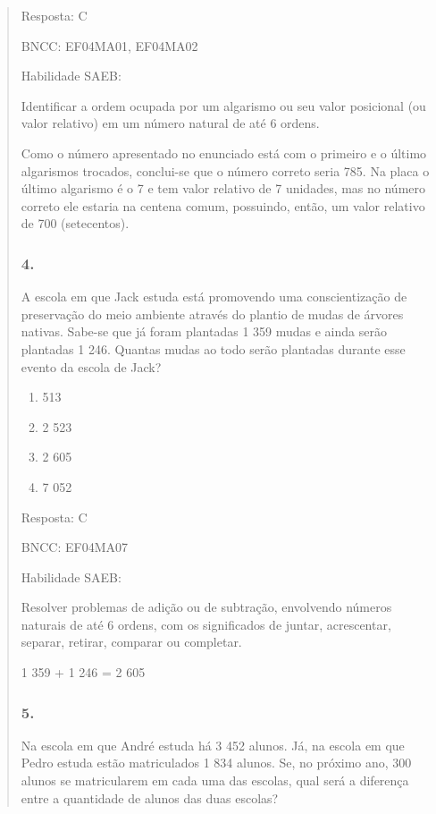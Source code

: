 \begin{enumerate}
\begin{escolha}
\begin{enumerate}
\begin{itemize}
\begin{itemize}
\begin{escolha}
\begin{quote}
\begin{escolha}
{Resposta: C

BNCC: EF04MA01, EF04MA02

Habilidade SAEB:

Identificar a ordem ocupada por um algarismo ou seu valor posicional (ou
valor relativo) em um número natural de até 6 ordens.

Como o número apresentado no enunciado está com o primeiro e o último
algarismos trocados, conclui-se que o número correto seria 785. Na placa
o último algarismo é o 7 e tem valor relativo de 7 unidades, mas no
número correto ele estaria na centena comum, possuindo, então, um valor
relativo de 700 (setecentos).

\subsubsection{4.}\label{section-146}

A escola em que Jack estuda está promovendo uma conscientização de
preservação do meio ambiente através do plantio de mudas de árvores
nativas. Sabe-se que já foram plantadas 1 359 mudas e ainda serão
plantadas 1 246. Quantas mudas ao todo serão plantadas durante esse
evento da escola de Jack?

\begin{enumerate}
\def\labelenumi{\alph{enumi})}
\item
  513
\item
  2 523
\item
  2 605
\item
  7 052
\end{enumerate}

Resposta: C

BNCC: EF04MA07

Habilidade SAEB:

Resolver problemas de adição ou de subtração, envolvendo números
naturais de até 6 ordens, com os significados de juntar, acrescentar,
separar, retirar, comparar ou completar.

1 359 + 1 246 = 2 605

\subsubsection{5.}\label{section-147}

Na escola em que André estuda há 3 452 alunos. Já, na escola em que
Pedro estuda estão matriculados 1 834 alunos. Se, no próximo ano, 300
alunos se matricularem em cada uma das escolas, qual será a diferença
entre a quantidade de alunos das duas escolas?

}
\end{escolha}
\end{quote}
\end{escolha}
\end{itemize}
\end{itemize}
\end{enumerate}
\end{escolha}
\end{enumerate}
